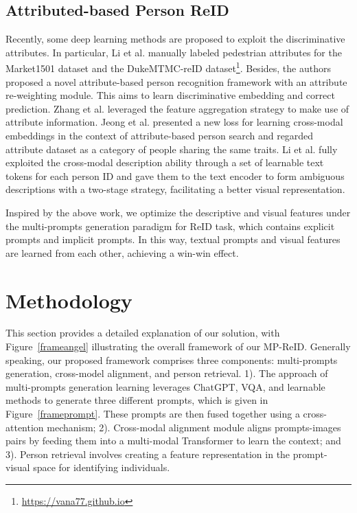 \documentclass[letterpaper]{article} %
\begin{document}
\subsection{Attributed-based Person ReID}

Recently, some deep learning methods are proposed to exploit the discriminative attributes. In particular, Li et al. \cite{li2019attribute}  manually labeled pedestrian attributes for the Market1501 dataset and the DukeMTMC-reID dataset\footnote{\url{https://vana77.github.io}}. Besides, the authors proposed a novel attribute-based person recognition framework with an attribute re-weighting module. This aims to learn discriminative embedding and correct prediction. Zhang et al. \cite{zhang2020person} leveraged the feature aggregation strategy to make use of attribute information. Jeong et al. \cite{jeong2021asmr} presented a new loss for learning cross-modal embeddings in the context of attribute-based person search and regarded attribute dataset as a category of people sharing the same traits. Li et al. \cite{li2022clip} fully exploited the cross-modal description ability through a set of learnable text tokens for each person ID and gave them to the text encoder to form ambiguous descriptions with a two-stage strategy, facilitating a better visual representation.

Inspired by the above work, we optimize the descriptive and visual features under the multi-prompts generation paradigm for ReID task, which contains explicit prompts and implicit prompts. In this way, textual prompts and visual features are learned from each other, achieving a win-win effect.

\section{Methodology} \label{methodology}
This section provides a detailed explanation of our solution, with Figure~\ref{frameangel} illustrating the overall framework of our MP-ReID. Generally speaking, our proposed framework comprises three components: multi-prompts generation, cross-model alignment, and person retrieval.
1). The approach of multi-prompts generation learning leverages ChatGPT, VQA, and learnable methods to generate three different prompts, which is given in Figure~\ref{frameprompt}. These prompts are then fused together using a cross-attention mechanism; 2). Cross-modal alignment module aligns prompts-images pairs by feeding them into a multi-modal Transformer to learn the context; and 3). Person retrieval involves creating a feature representation in the prompt-visual space for identifying individuals.
\end{document}
